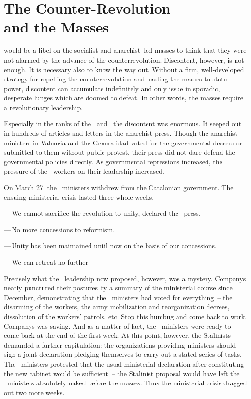 \chapter[Counter-Revolution and the Masses]{The Counter-Revolution \\ and the Masses}

 would be a libel on the socialist and anarchist--led masses to think that they were not alarmed by the advance of the counterrevolution. Discontent, however, is not enough. It is necessary also to know the way out. Without a firm, well-developed strategy for repelling the counterrevolution and leading the masses to state power, discontent can accumulate indefinitely and only issue in sporadic, desperate lunges which are doomed to defeat. In other words, the masses require a revolutionary leadership.

Especially in the ranks of the \CNT\ and \FAI\ the discontent was enormous. It seeped out in hundreds of articles and letters in the anarchist press. Though the anarchist ministers in Valencia and the Generalidad voted for the governmental decrees or submitted to them without public protest, their press did not dare defend the governmental policies directly. As governmental repressions increased, the pressure of the \CNT\ workers on their leadership increased.

On March 27, the \CNT\ ministers withdrew from the Catalonian government. The ensuing ministerial crisis lasted three whole weeks.

\bigskip

—\,We cannot sacrifice the revolution to unity, declared the \CNT\ press.

—\,No more concessions to reformism.

—\,Unity has been maintained until now on the basis of our concessions.

—\,We can retreat no further.

\bigskip

Precisely what the \CNT\ leadership now proposed, however, was a mystery. Companys neatly punctured their postures by a summary of the ministerial course since December, demonstrating that the \CNT\ ministers had voted for everything~-- the disarming of the workers, the army mobilization and reorganization decrees, dissolution of the workers’ patrols, etc. Stop this humbug and come back to work, Companys was saving. And as a matter of fact, the \CNT\ ministers were ready to come back at the end of the first week. At this point, however, the Stalinists demanded a further capitulation: the organizations providing ministers should sign a joint declaration pledging themselves to carry out a stated series of tasks. The \CNT\ ministers protested that the usual ministerial declaration after constituting the new cabinet would be sufficient~-- the Stalinist proposal would have left the \CNT\ ministers absolutely naked before the masses. Thus the ministerial crisis dragged out two more weeks.

